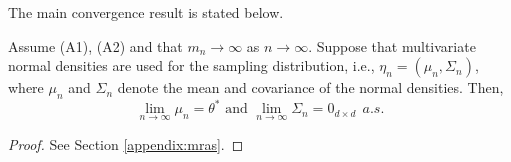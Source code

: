 The main convergence result is stated below.
\begin{theorem}\label{thm:mras}
Assume (A1), (A2) and that $m_n \rightarrow \infty$ as $n\rightarrow \infty$. Suppose that multivariate normal densities are used for the sampling distribution, i.e., $\eta_n = (\mu_n, \Sigma_n)$, where $\mu_n$ and $\Sigma_n$ denote the mean and covariance of the normal densities.
Then, 
\begin{equation}\label{eqn:smain}
\lim_{n\rightarrow \infty}\mu_n=\theta^* \text{ and } \lim_{n\rightarrow \infty}\Sigma_n=0_{d\times d}~~a.s.
\end{equation}
\end{theorem}
\begin{proof}
 See Section \ref{appendix:mras}.
\end{proof}
